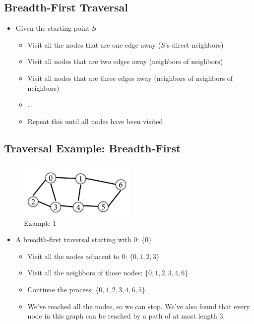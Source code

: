 \documentclass[
  10pt,
  english,
  letterpaper,
,tablecaptionabove
]{scrartcl}
\providecommand{\tightlist}{%
  \setlength{\itemsep}{0pt}\setlength{\parskip}{0pt}}
\begin{document}
\hypertarget{breadth-first-traversal}{%
\subsection{Breadth-First Traversal}\label{breadth-first-traversal}}

\begin{itemize}
\tightlist
\item
  Given the starting point \(S\)

  \begin{itemize}
  \tightlist
  \item
    Visit all the nodes that are one edge away (\(S\)'s direct
    neighbors)
  \item
    Visit all nodes that are two edges away (neighbors of neighbors)
  \item
    Visit all nodes that are three edges away (neighbors of neighbors of
    neighbors)
  \item
    \ldots{}
  \item
    Repeat this until all nodes have been visited
  \end{itemize}
\end{itemize}

\hypertarget{traversal-example-breadth-first}{%
\subsection{Traversal Example:
Breadth-First}\label{traversal-example-breadth-first}}

\begin{figure}
\centering
\includegraphics[width=0.5\textwidth,height=\textheight]{images/3.png}
\caption{Example 1}
\end{figure}

\begin{itemize}
\tightlist
\item
  A breadth-first traversal starting with \(0\): \(\{0\}\)

  \begin{itemize}
  \tightlist
  \item
    Visit all the nodes adjacent to \(0\): \(\{0, 1, 2, 3\}\)
  \item
    Visit all the neighbors of those nodes: \(\{0, 1, 2, 3, 4, 6\}\)
  \item
    Continue the process: \(\{0, 1, 2, 3, 4, 6, 5\}\)
  \item
    We've reached all the nodes, so we can stop. We've also found that
    every node in this graph can be reached by a path of at most length
    \(3\).
  \end{itemize}
\end{itemize}
\end{document}
